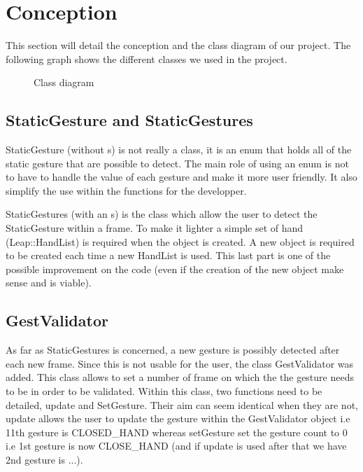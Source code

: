 \section{Conception}

This section will detail the conception and the class diagram of our project. The following graph shows the different classes we used in the project.

\begin{figure}
 \centering
 
 \caption{Class diagram}
 \label{figure:example}
\end{figure}

\subsection{StaticGesture and StaticGestures}

StaticGesture (without s) is not really a class, it is an enum that holds all of the static gesture that are possible to detect. The main role of using an enum is not to have to handle the value of each gesture and make it more user friendly. It also simplify the use within the functions for the developper.

StaticGestures (with an s) is the class which allow the user to detect the StaticGesture within a frame. To make it lighter a simple set of hand (Leap::HandList) is required when the object is created. A new object is required to be created each time a new HandList is used. This last part is one of the possible improvement on the code (even if the creation of the new object make sense and is viable).

\subsection{GestValidator}

As far as StaticGestures is concerned, a new gesture is possibly detected after each new frame. Since this is not usable for the user, the class GestValidator was added. This class allows to set a number of frame on which the the gesture needs to be in order to be validated.
Within this class, two functions need to be detailed, update and SetGesture. Their aim can seem identical when they are not, update allows the user to update the gesture within the GestValidator object i.e 11th gesture is CLOSED_HAND whereas setGesture set the gesture count to 0 i.e 1st gesture is now CLOSE_HAND (and if update is used after that we have 2nd gesture is ...).

